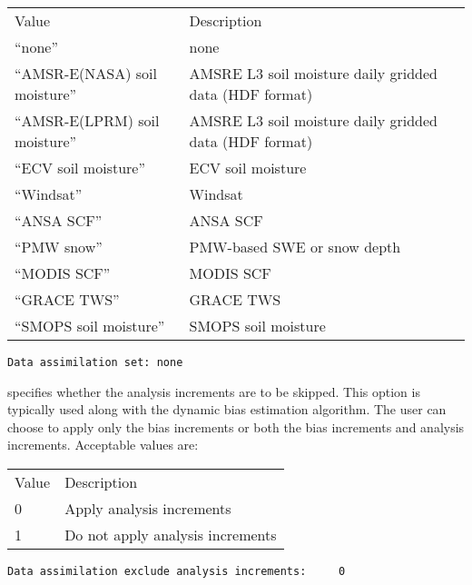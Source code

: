  \begin{tabular}{ll}
 Value                          & Description               \\
 ``none''                       & none                      \\
 ``AMSR-E(NASA) soil moisture'' & AMSRE L3 soil moisture daily gridded data (HDF format) \\
 ``AMSR-E(LPRM) soil moisture'' & AMSRE L3 soil moisture daily gridded data (HDF format) \\
 ``ECV soil moisture''          & ECV soil moisture         \\
 ``Windsat''                    & Windsat                   \\
 ``ANSA SCF''                   & ANSA SCF                  \\
 ``PMW snow''                   & PMW-based SWE or snow depth  \\
 ``MODIS SCF''                  & MODIS SCF                 \\
 ``GRACE TWS''                  & GRACE TWS                 \\
 ``SMOPS soil moisture''        & SMOPS soil moisture    \\
 \end{tabular}
 

 \begin{Verbatim}[frame=single]
Data assimilation set: none
 \end{Verbatim}

 

  specifies whether
 the analysis increments
 are to be skipped. This option is typically used along with the dynamic
 bias estimation algorithm. The user can choose to apply only the bias
 increments or both the bias increments and analysis increments. 
 Acceptable values are:

 \begin{tabular}{ll}
 Value & Description                                       \\
 0     &  Apply analysis increments                        \\
 1     &  Do not apply analysis increments                 \\
 \end{tabular}
 

 \begin{Verbatim}[frame=single]
Data assimilation exclude analysis increments:     0
 \end{Verbatim}

